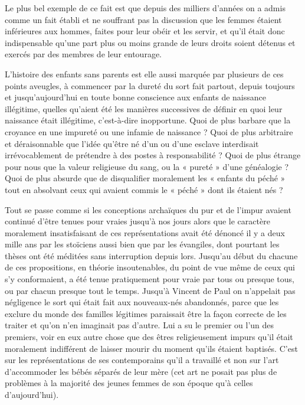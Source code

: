  Le plus bel exemple de ce fait est que depuis des milliers d'années on a admis comme un fait établi et ne souffrant pas la discussion que les femmes étaient inférieures aux hommes, faites pour leur obéir et les servir, et qu'il était donc indispensable qu'une part plus ou moins grande de leurs droits soient détenus et exercés par des membres de leur entourage. 

 L'histoire des enfants sans parents est elle aussi marquée par plusieurs de ces points aveugles, à commencer par la dureté du sort fait partout, depuis toujours et jusqu'aujourd'hui en toute bonne conscience aux enfants de naissance illégitime, quelles qu'aient été les manières successives de définir en quoi leur naissance était illégitime, c'est-à-dire inopportune. Quoi de plus barbare que la croyance en une impureté ou une infamie de naissance ? Quoi de plus arbitraire et déraisonnable que l'idée qu'être né d'un ou d'une esclave interdisait irrévocablement de prétendre à des postes à responsabilité ? Quoi de plus étrange pour nous que la valeur religieuse du sang, ou la « pureté » d'une généalogie ? Quoi de plus absurde que de disqualifier moralement les « enfants du péché » tout en absolvant ceux qui avaient commis le « péché » dont ils étaient nés ? 

 Tout se passe comme si les conceptions archaïques du pur et de l'impur avaient continué d'être tenues pour vraies jusqu'à nos jours alors que le caractère moralement insatisfaisant de ces représentations avait été dénoncé il y a deux mille ans par les stoïciens aussi bien que par les évangiles, dont pourtant les thèses ont été méditées sans interruption depuis lors. Jusqu'au début du  chacune de ces propositions, en théorie insoutenables, du point de vue même de ceux qui s'y conformaient, a été tenue pratiquement pour vraie par tous ou presque tous, ou par chacun presque tout le temps. Jusqu'à Vincent de Paul on n'appelait pas négligence le sort qui était fait aux nouveaux-nés abandonnés, parce que les exclure du monde des familles légitimes paraissait être la façon correcte de les traiter et qu'on n'en imaginait pas d'autre. Lui a su le premier ou l'un des premiers, voir en eux autre chose que des êtres religieusement impurs qu'il était moralement indifférent de laisser mourir du moment qu'ils étaient baptisés. C'est sur les représentations de ses contemporains qu'il a travaillé et non sur l'art d'accommoder les bébés séparés de leur mère (cet art ne posait pas plus de problèmes à la majorité des jeunes femmes de son époque qu'à celles d'aujourd'hui). 

